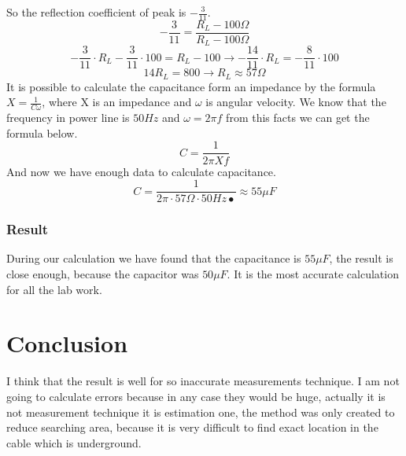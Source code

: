 \documentclass[english]{article}
\begin{document}
So the reflection coefficient of peak is $-\frac{3}{11}$.
$$
-\frac{3}{11}=\frac{R_L-100\Omega}{R_L-100\Omega}
$$
$$
-\frac{3}{11} \cdot R_L-\frac{3}{11} \cdot 100=R_L-100
\rightarrow
-\frac{14}{11} \cdot R_L= -\frac{8}{11} \cdot 100
$$
$$
14R_L=800 \rightarrow R_L\approx57\Omega
$$
It is possible to calculate the capacitance form an impedance by the formula $X=\frac{1}{C \omega}$, where X is an impedance and $\omega$ is angular velocity. We know that the frequency in power line is $50Hz$ and $\omega=2 \pi f$ from this facts we can get the formula below.
 $$C=\frac{1}{2\pi Xf}$$
 And now we have enough data to calculate capacitance.
 $$
 C=\frac{1}{2 \pi\cdot 57\Omega \cdot 50Hz•}\approx55 \mu F
 $$
 \subsubsection{Result}
 During our calculation we have found that the capacitance is $55\mu F$, the result is close enough, because the capacitor was $50\mu F$. It is the most accurate calculation for all the lab work.
\section{Conclusion}
I think that the result is well for so inaccurate measurements technique. I am not going to calculate errors because in any case they would be huge, actually it is not measurement technique it is estimation one, the method was only created to reduce searching area, because it is very difficult to find exact location in the cable which is underground.
\end{document}
